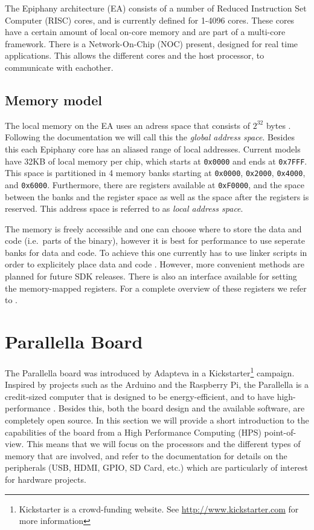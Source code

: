 \documentclass[fleqn]{article}
\renewcommand{\(}{\left(}
\renewcommand{\)}{\right)}
\def\tm{$^{\hbox{\tiny TM}}$~}
\renewcommand{\tm}{ }
\begin{document}
The Epiphany\tm architecture (EA) consists of a number of Reduced Instruction Set Computer (RISC) cores, and is currently defined for 1-4096 cores. These cores have a certain amount of local on-core memory and are part of a multi-core framework. There is a Network-On-Chip (NOC) present, designed for real time applications. This allows the different cores and the host processor, to communicate with eachother. 

\subsection{Memory model}

The local memory on the EA uses an adress space that consists of $2^{32}$ bytes \cite{ep:sdkdoc}. Following the documentation we will call this the \emph{global address space}. Besides this each Epiphany core has an aliased range of local addresses. Current models have 32KB of local memory per chip, which starts at \texttt{0x0000} and ends at \texttt{0x7FFF}. This space is partitioned in 4 memory banks starting at \texttt{0x0000}, \texttt{0x2000}, \texttt{0x4000}, and \texttt{0x6000}. Furthermore, there are registers available at \texttt{0xF0000}, and the space between the banks and the register space as well as the space after the registers is reserved. This address space is referred to as \emph{local address space}.



The memory is freely accessible and one can choose where to store the data and code (i.e.\ parts of the binary), however it is best for performance to use seperate banks for data and code. To achieve this one currently has to use linker scripts in order to explicitely place data and code \cite{ep:sdkdoc}. However, more convenient methods are planned for future SDK releases. There is also an interface available for setting the memory-mapped registers. For a complete overview of these registers we refer to \cite{ep:archdoc}.

\section{Parallella Board}

The Parallella board was introduced by Adapteva in a Kickstarter\footnote{Kickstarter is a crowd-funding website. See \url{http://www.kickstarter.com} for more information} campaign. Inspired by projects such as the Arduino and the Raspberry Pi, the Parallella is a credit-sized computer that is designed to be energy-efficient, and to have high-performance \cite{par:manual}. Besides this, both the board design and the available software, are completely open source. In this section we will provide a short introduction to the capabilities of the board from a High Performance Computing (HPS) point-of-view. This means that we will focus on the processors and the different types of memory that are involved, and refer to the documentation for details on the peripherals (USB, HDMI, GPIO, SD Card, etc.) which are particularly of interest for hardware projects. 
\end{document}
